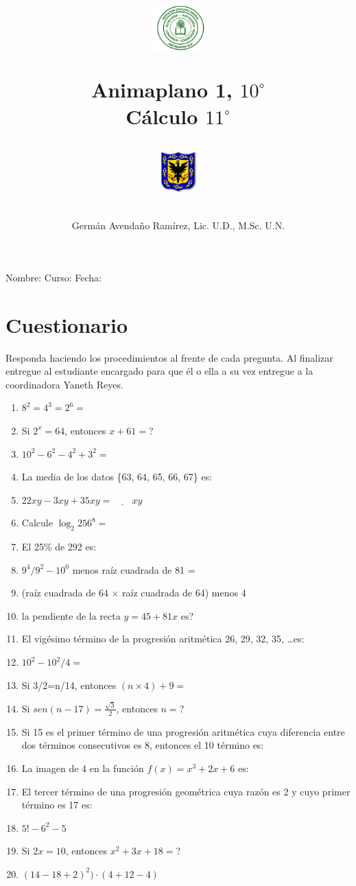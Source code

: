 \documentclass[11pt,twoside,letterpaper]{article}
\author{Germ\'an Avenda\~no Ram\'irez, Lic. U.D., M.Sc. U.N.}
\title{\begin{minipage}{.2\textwidth}
\includegraphics[height=1.75cm]{Images/logo-colegio.png}\end{minipage}
\begin{minipage}{.55\textwidth}
\begin{center}
Animaplano 1, $10^{\circ}$  \\
Cálculo $11^{\circ}$
\end{center}
\end{minipage}\hfill
\begin{minipage}{.2\textwidth}
\includegraphics[height=1.75cm]{Images/logo-sed.png} 
\end{minipage}}
\date{}
\begin{document}
\maketitle
Nombre: \hrulefill Curso: \underline{\hspace*{44pt}} Fecha: \underline{\hspace*{2.5cm}}
\section*{Cuestionario}
Responda haciendo los procedimientos al frente de cada pregunta. Al finalizar entregue al estudiante encargado para que él o ella a su vez entregue a la coordinadora Yaneth Reyes.
\begin{enumerate}
 \item $8^{2}=4^{3}=2^{6}=$
 \item Si $2^{x}=64$, entonces $x+61=$?
 \item $10^{2}-6^{2}-4^{2}+3^{2}=$
 \item La media de los datos \{63, 64, 65, 66, 67\} es:
 \item $22xy-3xy+35xy=\underline{\hspace{24pt}}xy$
 \item Calcule $\log_{2}256^{8}=$
 \item El 25\% de 292 es:
 \item $9^{4}/9^{2}-10^{0}$ menos raíz cuadrada de 81 =
 \item (raíz cuadrada de 64 $\times$ raíz cuadrada de 64) menos 4
 \item la pendiente de la recta $y=45+81x$ es?
 \item El vigésimo término de la progresión aritmética 26, 29, 32, 35, \dots es:
 \item $10^{2}-10^{2}/4=$
 \item Si 3/2=n/14, entonces $(n\times4)+9=$
 \item Si $sen(n-17)=\frac{\sqrt{3}}{2}$, entonces $n=$?
 \item Si 15 es el primer término de una progresión aritmética cuya diferencia entre dos términos consecutivos es 8, entonces el 10 término es:
 \item La imagen de 4 en la función $f(x)=x^{3}+2x+6$ es:
 \item El tercer término de una progresión geométrica cuya razón es 2 y cuyo primer término es 17 es:
 \item $5!-6^{2}-5$
 \item Si $2x=10$, entonces $x^{2}+3x+18=$?
 \item $(14-18+2)^{2})\cdot(4+12-4)$

\end{enumerate}
\end{document}
